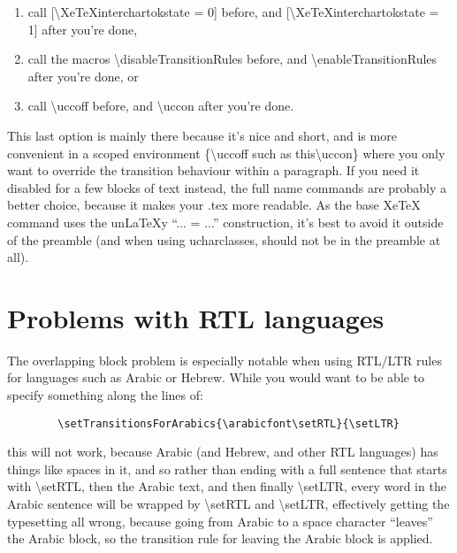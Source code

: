\documentclass{article}
\newenvironment{numberlist}{%
  \begin{enumerate}
  \setlength{\itemsep}{0pt}
  \setlength{\parsep}{0pt}
  \setlength{\topsep}{0pt}
  \setlength{\partopsep}{0pt}
  \setlength{\parskip}{0pt}
  \setlength{\labelsep}{5pt}}%
{
  \end{enumerate}}
\begin{document}
      \begin{numberlist}
        \item call [\textbackslash XeTeXinterchartokstate = 0] before, and [\textbackslash XeTeXinterchartokstate = 1] after you're done,
        \item call the macros \textbackslash disableTransitionRules before, and \textbackslash enableTransitionRules after you're done, or
        \item call \textbackslash uccoff before, and \textbackslash uccon after you're done.
      \end{numberlist}

      This last option is mainly there because it's nice and short, and is more convenient in a scoped environment \{\textbackslash uccoff such as this\textbackslash uccon\} where you only want to override the transition behaviour within a paragraph. If you need it disabled for a few blocks of text instead, the full name commands are probably a better choice, because it makes your .tex more readable. As the base XeTeX command uses the un\LaTeX y “... = ...” construction, it's best to avoid it outside of the preamble (and when using ucharclasses, should not be in the preamble at all).

  \pagebreak

  \section{Problems with RTL languages}

    The overlapping block problem is especially notable when using RTL/LTR rules for languages such as Arabic or Hebrew. While you would want to be able to specify something along the lines of:

    \begin{verbatim}
        \setTransitionsForArabics{\arabicfont\setRTL}{\setLTR}
    \end{verbatim}

    this will not work, because Arabic (and Hebrew, and other RTL languages) has things like spaces in it, and so rather than ending with a full sentence that starts with \textbackslash setRTL, then the Arabic text, and then finally \textbackslash setLTR, every word in the Arabic sentence will be wrapped by \textbackslash setRTL and \textbackslash setLTR, effectively getting the typesetting all wrong, because going from Arabic to a space character “leaves” the Arabic block, so the transition rule for leaving the Arabic block is applied.
\end{document}
